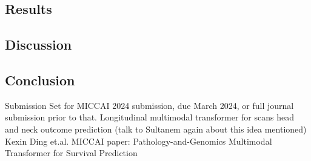 \documentclass{article}%
\begin{document}
%
\subsection{}%
\label{subsec:}%

%
\subsection{}%
\label{subsec:}%

%
\subsection{Results }%
\label{subsec:Results}%

%
\subsection{}%
\label{subsec:}%

%
\subsection{}%
\label{subsec:}%

%
\subsection{}%
\label{subsec:}%

%
\subsection{Discussion }%
\label{subsec:Discussion}%

%
%
\newline%
\newline%
%
\subsection{Conclusion }%
\label{subsec:Conclusion}%

%
%
\newline%
\newline%
%
Submission%
\newline%
\newline%
%
Set for MICCAI 2024 submission, due March 2024, or full journal submission prior to that. %
\newline%
\newline%
%
Longitudinal multimodal transformer for scans head and neck outcome prediction (talk to Sultanem again about this idea mentioned) %
\newline%
\newline%
%
Kexin Ding et.al. %
\newline%
\newline%
%
MICCAI paper: Pathology{-}and{-}Genomics Multimodal Transformer for Survival Prediction %
\newline%
\newline%
%
%
\newline%
\newline%
%
%
\newline%
\newline%
%
%
\newline%
\newline%
%
\end{document}
